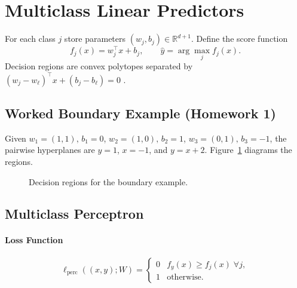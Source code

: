 \documentclass{article}
\begin{document}
\section{Multiclass Linear Predictors}\label{sec:models}
For each class $j$ store parameters $(w_{j},b_{j})\in\mathbb{R}^{d+1}$.
Define the score function
\[
f_{j}(x)=w_{j}^{\top}x+b_{j},
\qquad
\hat y=\arg\max_{j}f_{j}(x).
\]
Decision regions are convex polytopes separated by
$(w_{j}-w_{\ell})^{\top}x+(b_{j}-b_{\ell})=0$
\cite{crammer2001}.%

\subsection{Worked Boundary Example (Homework 1)}
Given
$w_{1}=(1,1),\,b_{1}=0$,
$w_{2}=(1,0),\,b_{2}=1$,
$w_{3}=(0,1),\,b_{3}=-1$,
the pairwise hyperplanes are
$y=1$, $x=-1$, and $y=x+2$.
Figure~\ref{fig:regions} diagrams the regions.
\begin{figure}[h]
\centering
{}
\caption{Decision regions for the boundary example.}
\label{fig:regions}
\end{figure}

\subsection{Multiclass Perceptron}
\paragraph{Loss Function}
\[
\ell_{\text{perc}}((x,y);W)=
\begin{cases}
0 & f_{y}(x)\ge f_{j}(x)\;\forall j,\\
1 & \text{otherwise.}
\end{cases}
\]
\end{document}
